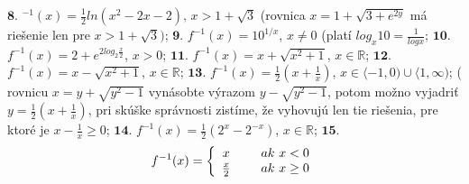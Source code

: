 $\boldsymbol{8.}$
$ ^{-1} (x)= \frac{1}{2}ln (x^{2}-2x-2), \, x>1+ \sqrt{3} $ (rovnica $ x=1+ \sqrt{3+e^{2y}} $ má riešenie len pre $ x>1+ \sqrt{3}) $;
$\boldsymbol{9.}$
$ f^{-1} (x)=10^{1/x}$, $x\ne 0  $ (platí $ log_{x}10 = \frac{1}{log x} $; 
$\boldsymbol{10.}$
$ f^{-1} (x)=2 + e^{2 log_{2}\frac{x}{2}}$, $x> 0  $;
$\boldsymbol{11.}$
$ f^{-1} (x)=x + \sqrt{x^{2}+1}$, $x \in \mathbb{R}  $;
$\boldsymbol{12.}$
$ f^{-1} (x)=x - \sqrt{x^{2}+1}$, $x \in \mathbb{R}  $;
$\boldsymbol{13.}$
$ f^{-1} (x)= \frac{1}{2}(x+ \frac{1}{x})$, $x \in \langle-1,0) \cup \langle1, \infty)  $; ( rovnicu $ x = y + \sqrt{y^{2}-1} $ vynásobte výrazom $ y -  \sqrt{y^{2}-1} $, potom možno vyjadriť $ y= \frac{1}{2}(x+ \frac{1}{x}) $, pri skúške správnosti zistíme, že vyhovujú len tie riešenia, pre ktoré je $ x - \frac{1}{x}\geq 0  $;
$\boldsymbol{14.}$
$ f^{-1} (x)= \frac{1}{2}( 2^{x}- 2^{-x})$, $x \in \mathbb{R}  $;
$\boldsymbol{15.}$
\begin{align*} 
f^{-1}(x)= \left\{ \begin{array}{cc} 
                x & \hspace{5mm} ak\ x < 0 \\
                 \frac{x}{2} & \hspace{5mm} ak\ x \geq 0  \\
                \end{array} \right.
\end{align*}

